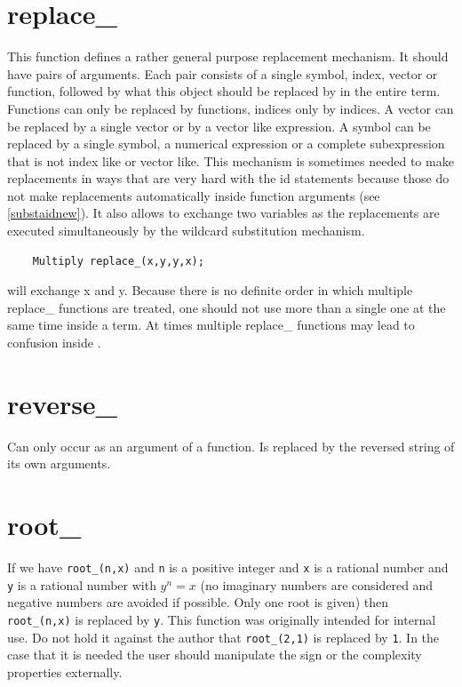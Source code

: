 \section{replace\_}
\label{funreplace}
\noindent This function defines a rather general purpose 
replacement mechanism. It should have pairs of 
arguments. Each pair consists of a single symbol, index, vector or 
function, followed by what this object should be replaced by in the entire 
term. Functions can only be replaced by functions, indices only by indices. 
A vector can be replaced by a single vector or by a vector like expression. 
A symbol can be replaced by a single symbol, a numerical expression or a 
complete subexpression that is not index like or vector like. This 
mechanism is sometimes needed to make replacements in ways that are very 
hard with the id statements because those do not make 
replacements automatically inside function arguments (see 
\ref{substaidnew}). It also allows to exchange two variables as the 
replacements are executed simultaneously by the wildcard substitution 
mechanism.
\begin{verbatim}
    Multiply replace_(x,y,y,x);
\end{verbatim}
will exchange x and y. Because there is no definite order in which multiple 
replace\_ functions are treated, one should not use more than a single one 
at the same time inside a term. At times multiple replace\_ functions may 
lead to confusion inside \FORM\@.


\section{reverse\_}
\label{funreverse}
\noindent Can only occur as an argument of a function. Is replaced 
by the reversed string of its own arguments.


\section{root\_}
\label{funroot}
\noindent If we have \verb:root_(n,x): and \verb:n: is a positive 
integer and \verb:x: is a rational number and \verb:y: is a rational number 
with $y^n = x$ (no imaginary numbers are considered and negative numbers 
are avoided if possible. Only one root is given) then \verb:root_(n,x): is 
replaced by \verb:y:. This function was originally intended for internal 
use. Do not hold it against the author that \verb:root_(2,1): is replaced 
by \verb:1:. In the case that it is needed the user should manipulate the 
sign or the complexity properties externally.

